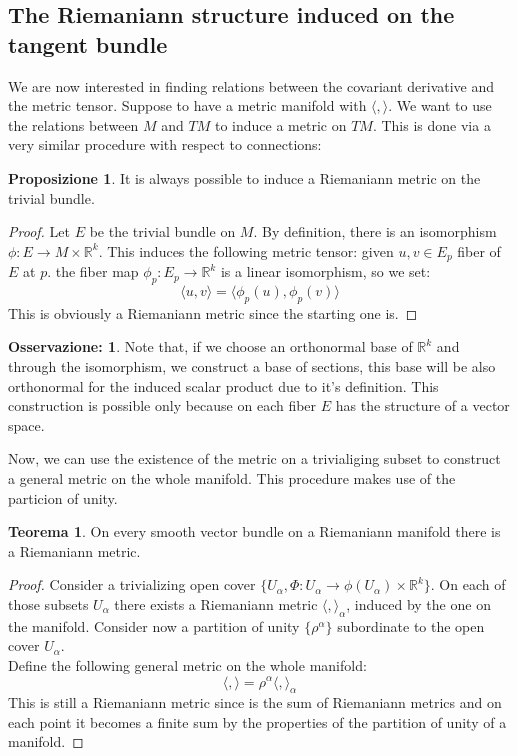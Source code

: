 \documentclass[12pt,a4paper]{report}
\theoremstyle{definition}
\theoremstyle{Theorem}
\newtheorem{Theo}[Def]{Teorema}
\newtheorem{Prop}[Def]{Proposizione}
\theoremstyle{definition}
\theoremstyle{definition}
\theoremstyle{definition}
\newtheorem{Obs}[Def]{Osservazione:}
\begin{document}
	\subsection{The Riemaniann structure induced on the tangent bundle}
	We are now interested in finding relations between the covariant derivative and the metric tensor. Suppose to have a metric manifold with $\langle,\rangle$. We want to use the relations between $M$ and $TM$ to induce a metric on $TM$. This is done via a very similar procedure with respect to connections:
	\begin{Prop}
		It is always possible to induce a Riemaniann metric on the trivial bundle.
	\end{Prop}
	\begin{proof}
		Let $E$ be the trivial bundle on $M$. By definition, there is an isomorphism $\phi:E\rightarrow M\times \mathbb{R}^k$. This induces the following metric tensor: given $u,v\in E_p$ fiber of $E$ at $p$. the fiber map $\phi_p:E_p\rightarrow \mathbb{R}^k$ is a linear isomorphism, so we set:
		$$\langle u,v\rangle=\langle\phi_p(u),\phi_p(v) \rangle$$
		This is obviously a Riemaniann metric since the starting one is.
	\end{proof}
	\begin{Obs}
		Note that, if we choose an orthonormal base of $\mathbb{R}^k$ and through the isomorphism, we construct a base of sections, this base will be also orthonormal for the induced scalar product due to it's definition. This construction is possible only because on each fiber $E$ has the structure of a vector space.
	\end{Obs}
	Now, we can use the existence of the metric on a trivialiging subset to construct a general metric on the whole manifold. This procedure makes use of the particion of unity.
	\begin{Theo}
		On every smooth vector bundle on a Riemaniann manifold there is a Riemaniann metric.
	\end{Theo}
	\begin{proof}
		Consider a trivializing open cover $\{U_\alpha,\Phi:U_\alpha\rightarrow \phi(U_\alpha)\times \mathbb{R}^k\}$. On each of those subsets $U_\alpha$ there exists a Riemaniann metric $\langle,\rangle_\alpha$, induced by the one on the manifold. Consider now a partition of unity $\{\rho^\alpha\}$ subordinate to the open cover $U_\alpha$.\\
		Define the following general metric on the whole manifold:
		$$\langle,\rangle=\rho^\alpha\langle,\rangle_\alpha$$
		This is still a Riemaniann metric since is the sum of Riemaniann metrics and on each point it becomes a finite sum by the properties of the partition of unity of a manifold.
	\end{proof}
\end{document}
